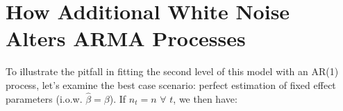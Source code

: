 






 




\section{How Additional White Noise Alters ARMA Processes}

To illustrate the pitfall in fitting the second level of this model with an AR(1) process, let's examine the best case scenario:
perfect estimation of fixed effect parameters (i.o.w. $\hat{\beta} = \beta$). If $n_t=n$  $\forall$ $t$, we then have:

